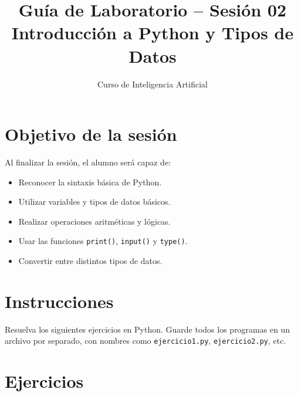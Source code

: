 \documentclass[12pt,a4paper]{article}
\title{\textbf{Guía de Laboratorio – Sesión 02} \\ Introducción a Python y Tipos de Datos}
\author{Curso de Inteligencia Artificial}
\date{}
\begin{document}
\maketitle

\section*{Objetivo de la sesión}
Al finalizar la sesión, el alumno será capaz de:
\begin{itemize}
    \item Reconocer la sintaxis básica de Python.
    \item Utilizar variables y tipos de datos básicos.
    \item Realizar operaciones aritméticas y lógicas.
    \item Usar las funciones \texttt{print()}, \texttt{input()} y \texttt{type()}.
    \item Convertir entre distintos tipos de datos.
\end{itemize}

\section*{Instrucciones}
Resuelva los siguientes ejercicios en Python. Guarde todos los programas en un archivo por separado, con nombres como \texttt{ejercicio1.py}, \texttt{ejercicio2.py}, etc.

\section*{Ejercicios}
\end{document}
